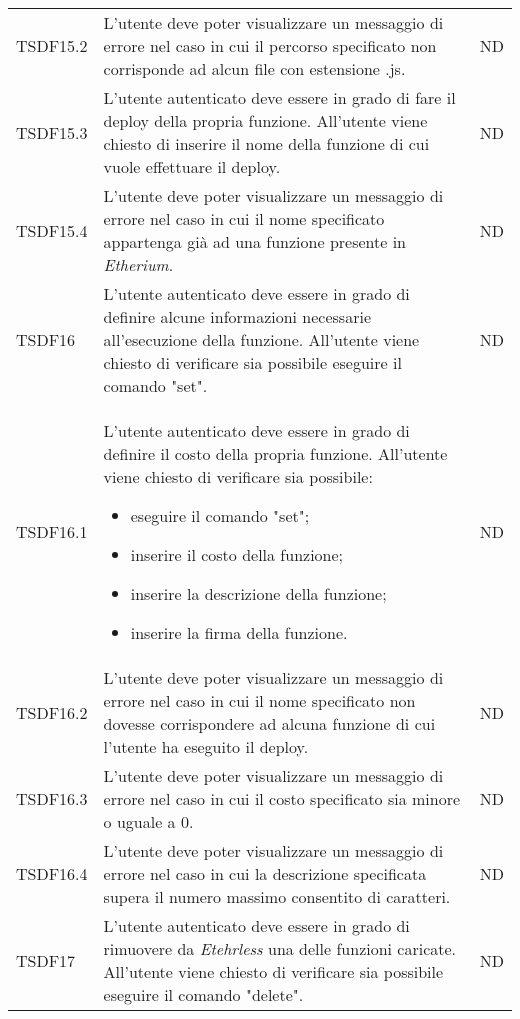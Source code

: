 \begin{longtable}{|C{2cm}|C{8cm}|C{2cm}|}
	TSDF15.2  &
	L’utente deve poter visualizzare un messaggio di errore nel caso in cui il percorso specificato non corrisponde ad alcun file con estensione .js. &
	ND \\
	
	TSDF15.3  &
	L'utente autenticato deve essere in grado di fare il deploy della propria funzione. All’utente viene chiesto di inserire il nome della funzione di cui vuole effettuare il deploy. &
	ND \\
	
	TSDF15.4  &
	L’utente deve poter visualizzare un messaggio di errore nel caso in cui il nome specificato appartenga già ad una funzione presente in \textit{Etherium\glo}. &
	ND \\
	
	TSDF16  &
	L'utente autenticato deve essere in grado di definire alcune informazioni necessarie all'esecuzione della funzione. All’utente viene chiesto di verificare sia possibile eseguire il comando "set". &
	ND \\
	
	TSDF16.1  &
	L'utente autenticato deve essere in grado di definire il costo della propria funzione. All’utente viene chiesto di verificare sia possibile:
	\begin{itemize}
		\item eseguire il comando "set";
		\item inserire il costo della funzione;
		\item inserire la descrizione della funzione;
		\item inserire la firma della funzione.
	\end{itemize} &
	ND \\
	
	TSDF16.2  &
	L’utente deve poter visualizzare un messaggio di errore nel caso in cui il nome specificato non dovesse corrispondere ad alcuna funzione di cui l'utente ha eseguito il deploy. &
	ND \\
	
	TSDF16.3  &
	L’utente deve poter visualizzare un messaggio di errore nel caso in cui il costo specificato sia minore o uguale a 0. &
	ND \\
	
	TSDF16.4  &
	L’utente deve poter visualizzare un messaggio di errore nel caso in cui la descrizione specificata supera il numero massimo consentito di caratteri. &
	ND \\
	
	TSDF17  &
	L'utente autenticato deve essere in grado di rimuovere da \textit{Etehrless} una delle funzioni caricate. All’utente viene chiesto di verificare sia possibile eseguire il comando "delete". &
	ND \\
	

\end{longtable}
